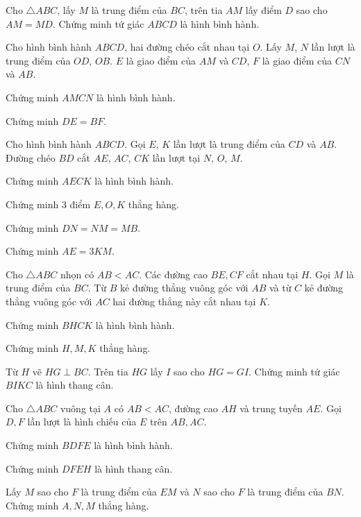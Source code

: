 

\cau Cho $\triangle ABC$, lấy $M$ là trung điểm của $BC$, trên tia $AM$ lấy điểm $D$ sao cho $AM = MD$. Chứng minh tứ giác $ABCD$ là hình bình hành.

\cau Cho hình bình hành $ABCD$, hai đường chéo cắt nhau tại $O$. Lấy $M$, $N$ lần lượt là trung điểm của $OD$, $OB$. $E$ là giao điểm của $AM$ và $CD$, $F$ là giao điểm của $CN$ và $AB$.
\begin{tuluan}
    \item Chứng minh $AMCN$ là hình bình hành.
    \item Chứng minh $DE = BF$.
\end{tuluan}


\cau Cho hình bình hành $ABCD$. Gọi $E$, $K$ lần lượt là trung điểm của $CD$ và $AB$. Đường chéo $BD$ cắt $AE$, $AC$, $CK$ lần lượt tại $N$, $O$, $M$.
\begin{tuluan}
    \item Chứng minh $AECK$ là hình bình hành.
    \item Chứng minh 3 điểm $E, O, K$ thẳng hàng.
    \item Chứng minh $DN = NM = MB$.
    \item Chứng minh $AE = 3KM$.
\end{tuluan}

\cau Cho $\triangle ABC$ nhọn có $AB < AC$. Các đường cao $BE, CF$ cắt nhau tại $H$. Gọi $M$ là trung điểm của $BC$. Từ $B$ kẻ đường thẳng vuông góc với $AB$ và từ $C$ kẻ đường thẳng vuông góc với $AC$ hai đường thẳng này cắt nhau tại $K$.
\begin{tuluan}
    \item Chứng minh $BHCK$ là hình bình hành.
    \item Chứng minh $H, M, K$ thẳng hàng.
    \item Từ $H$ vẽ $HG \perp BC$. Trên tia $HG$ lấy $I$ sao cho $HG = GI$. Chứng minh tứ giác $BIKC$ là hình thang cân.
\end{tuluan}

\cau Cho $\triangle ABC$ vuông tại $A$ có $AB < AC$, đường cao $AH$ và trung tuyến $AE$. Gọi $D, F$ lần lượt là hình chiếu của $E$ trên $AB, AC$.
\begin{tuluan}
    \item Chứng minh $BDFE$ là hình bình hành.
    \item Chứng minh $DFEH$ là hình thang cân.
    \item Lấy $M$ sao cho $F$ là trung điểm của $EM$ và $N$ sao cho $F$ là trung điểm của $BN$. Chứng minh $A, N, M$ thẳng hàng.
\end{tuluan}

